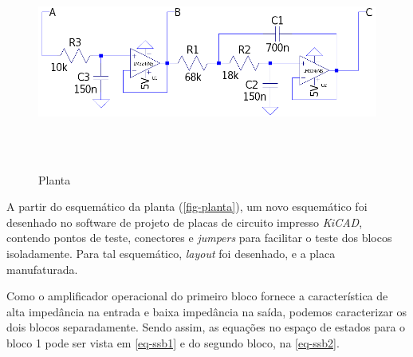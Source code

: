 \documentclass[
	12pt,				%
	article,			%
	openright,			%
	oneside,
	a4paper,			%
	chapter=TITLE,		%
	section=TITLE,		%
	english,			%
	french,				%
	spanish,			%
	brazil,				%
]{abntex2}
\begin{document}
        	\begin{figure}[htbp]
        		\centering
        		\caption{Planta}
        		\includegraphics[width=\textwidth,height=240px,keepaspectratio]{imgs/planta.png}
        		\label{fig-planta}
        	\end{figure}
        	
        	A partir do esquemático da planta (\autoref{fig-planta}), um novo esquemático foi desenhado no software de projeto de placas de circuito impresso \textit{KiCAD}, contendo pontos de teste, conectores e \textit{jumpers} para facilitar o teste dos blocos isoladamente. Para tal esquemático, \textit{layout} foi desenhado, e a placa manufaturada.
        	
        	Como o amplificador operacional do primeiro bloco fornece a característica de alta impedância na entrada e baixa impedância na saída, podemos caracterizar os dois blocos separadamente. Sendo assim, as equações no espaço de estados para o bloco 1 pode ser vista em \ref{eq-ssb1} e do segundo bloco, na \ref{eq-ssb2}.
        	
\end{document}
